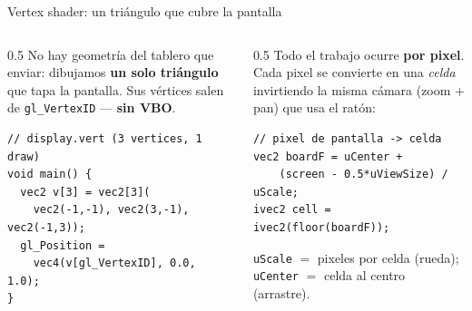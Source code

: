 \documentclass[aspectratio=169]{beamer}
\begin{document}
\begin{frame}[fragile]{Vertex shader: un triángulo que cubre la pantalla}
    \begin{columns}[T]
        \begin{column}{0.5\textwidth}
            \footnotesize
            No hay geometría del tablero que enviar: dibujamos \textbf{un solo
            triángulo} que tapa la pantalla. Sus vértices salen de
            \texttt{gl\_VertexID} --- \textbf{sin VBO}.
\begin{lstlisting}
// display.vert (3 vertices, 1 draw)
void main() {
  vec2 v[3] = vec2[3](
    vec2(-1,-1), vec2(3,-1), vec2(-1,3));
  gl_Position =
    vec4(v[gl_VertexID], 0.0, 1.0);
}
\end{lstlisting}
        \end{column}
        \begin{column}{0.5\textwidth}
            \footnotesize
            Todo el trabajo ocurre \textbf{por pixel}. Cada pixel se convierte en
            una \emph{celda} invirtiendo la misma cámara (zoom + pan) que usa el
            ratón:
\begin{lstlisting}
// pixel de pantalla -> celda
vec2 boardF = uCenter +
    (screen - 0.5*uViewSize) / uScale;
ivec2 cell = ivec2(floor(boardF));
\end{lstlisting}
            \begin{highlightbox}
                \footnotesize
                \texttt{uScale} $=$ pixeles por celda (rueda);\;
                \texttt{uCenter} $=$ celda al centro (arrastre).
            \end{highlightbox}
        \end{column}
    \end{columns}
\end{frame}
\end{document}
